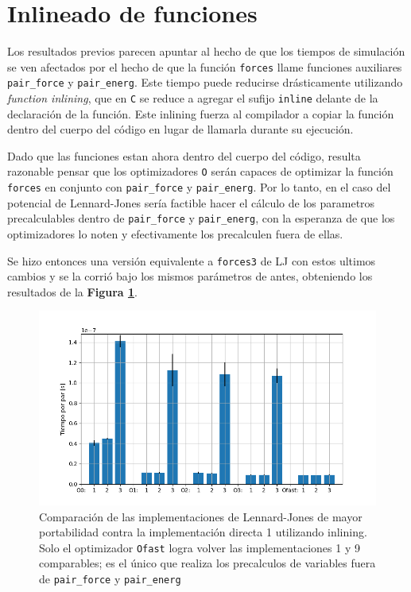 \documentclass[twoside, 12pt]{article}
\begin{document}
\section{Inlineado de funciones}

Los resultados previos parecen apuntar al hecho de que los tiempos de simulaci\'on se ven afectados por el hecho de que la funci\'on \texttt{forces} llame funciones auxiliares \texttt{pair\_force} y \texttt{pair\_energ}. Este tiempo puede reducirse dr\'asticamente utilizando \textit{function inlining}, que en \texttt{C} se reduce a agregar el sufijo \texttt{inline} delante de la declaraci\'on de la funci\'on. Este inlining fuerza al compilador a copiar la funci\'on dentro del cuerpo del c\'odigo en lugar de llamarla durante su ejecución. 

Dado que las funciones estan ahora dentro del cuerpo del c\'odigo, resulta razonable pensar que los optimizadores \texttt{O} ser\'an capaces de optimizar la funci\'on \texttt{forces} en conjunto con \texttt{pair\_force} y \texttt{pair\_energ}. Por lo tanto, en el caso del potencial de Lennard-Jones ser\'ia factible hacer el c\'alculo de los parametros precalculables dentro de \texttt{pair\_force} y \texttt{pair\_energ}, con la esperanza de que los optimizadores lo noten y efectivamente los precalculen fuera de ellas.

Se hizo entonces una versi\'on equivalente a \texttt{forces3} de LJ con estos ultimos cambios y se la corri\'o bajo los mismos par\'ametros de antes, obteniendo los resultados de la \textbf{Figura \ref{fig:CompEsp_LJ_inline}}.

\begin{figure}[h]
	\centering
	\includegraphics[trim = 10mm 5mm 10mm 5mm, clip, scale=0.7]{Imagenes/Comp_tiempos_LJ_inline.png}
	\caption{Comparaci\'on de las implementaciones de Lennard-Jones de mayor portabilidad contra la implementaci\'on directa 1 utilizando inlining. Solo el optimizador \texttt{Ofast} logra volver las implementaciones 1 y 9 comparables; es el \'unico que realiza los precalculos de variables fuera de \texttt{pair\_force} y \texttt{pair\_energ}}
	\label{fig:CompEsp_LJ_inline}
\end{figure}
\end{document}
